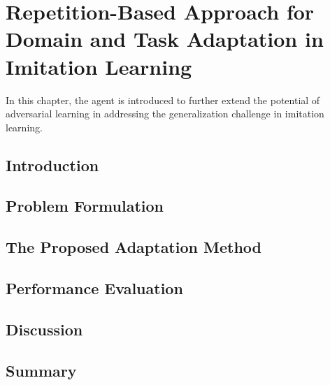 \chapter{Repetition-Based Approach for Domain and Task Adaptation in Imitation Learning\label{ch:DTAIL}}


In this chapter,
the \DTAIL{} agent is introduced to further extend the potential of adversarial learning in addressing the generalization challenge in imitation learning.


\renewcommand{\SectionsDir}{Chapter5/Sections}
\renewcommand{\FigsDir}{Chapter5/Figs}
\renewcommand{\TablesDir}{Chapter5/Tables}


\section{Introduction\label{ch:DTAIL:sec:Introduction}}


\section{Problem Formulation\label{ch:DTAIL:sec:ProblemFormulation}}


\section{The Proposed Adaptation Method\label{ch:DTAIL:sec:Proposal}}


\section{Performance Evaluation\label{ch:DTAIL:sec:Evaluation}}


\section{Discussion\label{ch:DTAIL:sec:Discussion}}


\section{Summary}

